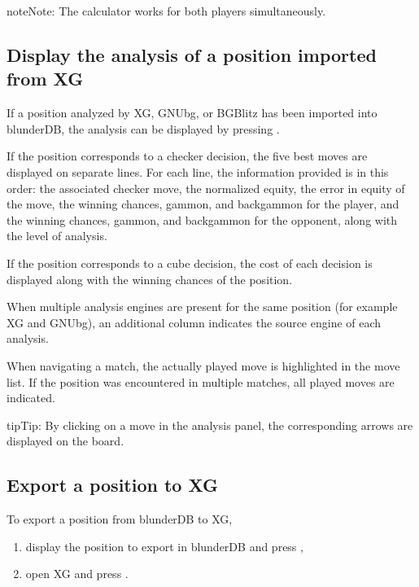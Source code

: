 \documentclass[letterpaper,10pt,english]{sphinxmanual}
\begin{document}
\begin{sphinxadmonition}{note}{Note:}
\sphinxAtStartPar
The calculator works for both players simultaneously.
\end{sphinxadmonition}


\subsection{Display the analysis of a position imported from XG}
\label{\detokenize{guide_utilisateur:afficher-l-analyse-d-une-position-importee-depuis-xg}}
\sphinxAtStartPar
If a position analyzed by XG, GNUbg, or BGBlitz has been imported into blunderDB, the analysis can be displayed by pressing .

\sphinxAtStartPar
If the position corresponds to a checker decision, the five best moves are displayed on separate lines. For each line, the information provided is in this order: the associated checker move, the normalized equity, the error in equity of the move, the winning chances, gammon, and backgammon for the player, and the winning chances, gammon, and backgammon for the opponent, along with the level of analysis.

\sphinxAtStartPar
If the position corresponds to a cube decision, the cost of each decision is displayed along with the winning chances of the position.

\sphinxAtStartPar
When multiple analysis engines are present for the same position (for example XG and GNUbg), an additional column indicates the source engine of each analysis.

\sphinxAtStartPar
When navigating a match, the actually played move is highlighted in the move list. If the position was encountered in multiple matches, all played moves are indicated.

\begin{sphinxadmonition}{tip}{Tip:}
\sphinxAtStartPar
By clicking on a move in the analysis panel, the corresponding arrows are displayed on the board.
\end{sphinxadmonition}


\subsection{Export a position to XG}
\label{\detokenize{guide_utilisateur:exporter-une-position-vers-xg}}
\sphinxAtStartPar
To export a position from blunderDB to XG,
\begin{enumerate}
%
\item {} 
\sphinxAtStartPar
display the position to export in blunderDB and press ,

\item {} 
\sphinxAtStartPar
open XG and press .

\end{enumerate}
\end{document}
